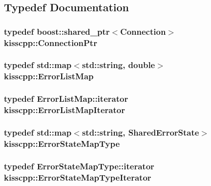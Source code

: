 \subsection{Typedef Documentation}
\hypertarget{a00089_a4632e92aebdc8fa1c220da260469cbb2}{
\subsubsection[{Connection\-Ptr}]{\setlength{\rightskip}{0pt plus 5cm}typedef boost\-::shared\-\_\-ptr$<${\bf Connection}$>$ {\bf kisscpp\-::\-Connection\-Ptr}}}\label{a00089_a4632e92aebdc8fa1c220da260469cbb2}
\hypertarget{a00089_a325b559f17774bf1155d5dda8fe335e3}{
\subsubsection[{Error\-List\-Map}]{\setlength{\rightskip}{0pt plus 5cm}typedef std\-::map$<$std\-::string, double$>$ {\bf kisscpp\-::\-Error\-List\-Map}}}\label{a00089_a325b559f17774bf1155d5dda8fe335e3}
\hypertarget{a00089_a5493eddaf40e71c5f85672b1ab37afcb}{
\subsubsection[{Error\-List\-Map\-Iterator}]{\setlength{\rightskip}{0pt plus 5cm}typedef Error\-List\-Map\-::iterator {\bf kisscpp\-::\-Error\-List\-Map\-Iterator}}}\label{a00089_a5493eddaf40e71c5f85672b1ab37afcb}
\hypertarget{a00089_ab99725cc511536c050d9cab582313d0c}{
\subsubsection[{Error\-State\-Map\-Type}]{\setlength{\rightskip}{0pt plus 5cm}typedef std\-::map$<$std\-::string, {\bf Shared\-Error\-State}$>$ {\bf kisscpp\-::\-Error\-State\-Map\-Type}}}\label{a00089_ab99725cc511536c050d9cab582313d0c}
\hypertarget{a00089_a37b3f68e4626dc05d9d2381803a889b4}{
\subsubsection[{Error\-State\-Map\-Type\-Iterator}]{\setlength{\rightskip}{0pt plus 5cm}typedef Error\-State\-Map\-Type\-::iterator {\bf kisscpp\-::\-Error\-State\-Map\-Type\-Iterator}}}\label{a00089_a37b3f68e4626dc05d9d2381803a889b4}
